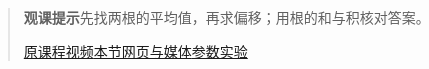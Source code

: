 \begin{quote}\small\textbf{观课提示}\quad 先找两根的平均值，再求偏移；用根的和与积核对答案。

\href{https://www.youtube.com/watch?v=MHXO86wKeDY}{原课程视频}\quad\href{https://vitael04213.github.io/3blue1brown-notes/lessons/ldm-quadratic.html}{本节网页与媒体}\quad\href{https://vitael04213.github.io/3blue1brown-notes/lab.html\#eigen}{参数实验}
\end{quote}

